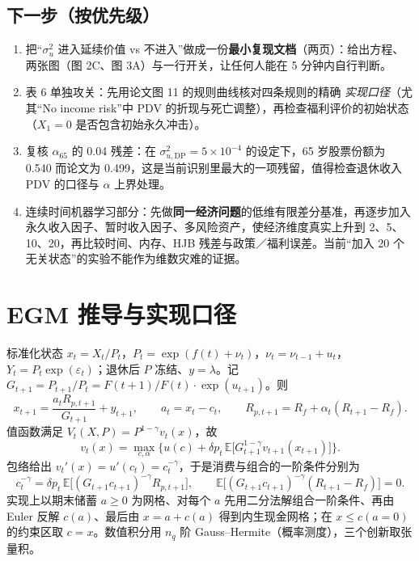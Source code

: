 \documentclass[UTF8,a4paper,11pt,fontset=fandol]{ctexart}
\newcommand{\su}{\sigma_u^2}
\newcommand{\suDP}{\sigma_{u,\mathrm{DP}}^{2}}
\begin{document}
\subsection{下一步（按优先级）}
\begin{enumerate}[leftmargin=2.2em,itemsep=1pt]
\item 把“\(\su\) 进入延续价值 vs 不进入”做成一份\textbf{最小复现文档}（两页）：给出方程、两张图（图 2C、图 3A）与一行开关，让任何人能在 5 分钟内自行判断。
\item 表 6 单独攻关：先用论文图 11 的规则曲线核对四条规则的精确 \emph{实现口径}（尤其“No income risk”中 PDV 的折现与死亡调整），再检查福利评价的初始状态（\(X_1=0\) 是否包含初始永久冲击）。
\item 复核 \(\alpha_{65}\) 的 0.04 残差：在 \(\suDP=5\times10^{-4}\) 的设定下，65 岁股票份额为 0.540 而论文为 0.499，这是当前识别里最大的一项残留，值得检查退休收入 PDV 的口径与 \(\alpha\) 上界处理。
\item 连续时间机器学习部分：先做\textbf{同一经济问题}的低维有限差分基准，再逐步加入永久收入因子、暂时收入因子、多风险资产，使经济维度真实上升到 2、5、10、20，再比较时间、内存、HJB 残差与政策／福利误差。当前“加入 20 个无关状态”的实验不能作为维数灾难的证据。
\end{enumerate}

\appendix
\section{EGM 推导与实现口径}
\label{sec:appendix}
标准化状态 \(x_t=X_t/P_t\)，\(P_t=\exp(f(t)+\nu_t)\)，\(\nu_t=\nu_{t-1}+u_t\)，\(Y_t=P_t\exp(\varepsilon_t)\)；退休后 \(P\) 冻结、\(y=\lambda\)。记 \(G_{t+1}=P_{t+1}/P_t=F(t{+}1)/F(t)\cdot\exp(u_{t+1})\)。则
\[
x_{t+1}=\frac{a_tR_{p,t+1}}{G_{t+1}}+y_{t+1},\qquad a_t=x_t-c_t,\qquad
R_{p,t+1}=R_f+\alpha_t(R_{t+1}-R_f).
\]
值函数满足 \(V_t(X,P)=P^{1-\gamma}v_t(x)\)，故
\[
v_t(x)=\max_{c,\alpha}\Big\{u(c)+\delta p_t\,\mathbb{E}\big[G_{t+1}^{1-\gamma}v_{t+1}(x_{t+1})\big]\Big\}.
\]
包络给出 \(v_t'(x)=u'(c_t)=c_t^{-\gamma}\)，于是消费与组合的一阶条件分别为
\[
c_t^{-\gamma}=\delta p_t\,\mathbb{E}\big[(G_{t+1}c_{t+1})^{-\gamma}R_{p,t+1}\big],\qquad
\mathbb{E}\big[(G_{t+1}c_{t+1})^{-\gamma}(R_{t+1}-R_f)\big]=0 .
\]
实现上以期末储蓄 \(a\ge0\) 为网格、对每个 \(a\) 先用二分法解组合一阶条件、再由 Euler 反解 \(c(a)\)、最后由 \(x=a+c(a)\) 得到内生现金网格；在 \(x\le c(a{=}0)\) 的约束区取 \(c=x\)。数值积分用 \(n_q\) 阶 Gauss--Hermite（概率测度），三个创新取张量积。
\end{document}
